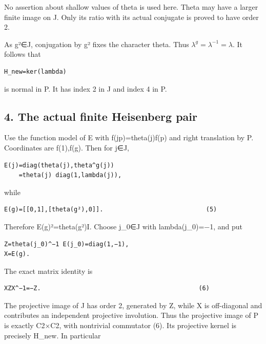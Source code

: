 No assertion about shallow values of theta is used here. Theta may have
a larger finite image on J. Only its ratio with its actual conjugate is
proved to have order 2.

As g²∈J, conjugation by g² fixes the character theta. Thus
\(\lambda^g=\lambda^{-1}=\lambda\). It follows that

\begin{Verbatim}[fontsize=\small,breaklines=true,breakanywhere=true]
H_new=ker(lambda)
\end{Verbatim}

is normal in P. It has index 2 in J and index 4 in P.

\hypertarget{rank2-the-actual-finite-heisenberg-pair}{%
\subsection{4. The actual finite Heisenberg
pair}\label{rank2-the-actual-finite-heisenberg-pair}}

Use the function model of E with f(jp)=theta(j)f(p) and right
translation by P. Coordinates are f(1),f(g). Then for j∈J,

\begin{Verbatim}[fontsize=\small,breaklines=true,breakanywhere=true]
E(j)=diag(theta(j),theta^g(j))
    =theta(j) diag(1,lambda(j)),
\end{Verbatim}

while

\begin{Verbatim}[fontsize=\small,breaklines=true,breakanywhere=true]
E(g)=[[0,1],[theta(g²),0]].                            (5)
\end{Verbatim}

Therefore E(g)²=theta(g²)I. Choose j\_0∈J with lambda(j\_0)=−1, and put

\begin{Verbatim}[fontsize=\small,breaklines=true,breakanywhere=true]
Z=theta(j_0)^−1 E(j_0)=diag(1,−1),
X=E(g).
\end{Verbatim}

The exact matrix identity is

\begin{Verbatim}[fontsize=\small,breaklines=true,breakanywhere=true]
XZX^−1=−Z.                                           (6)
\end{Verbatim}

The projective image of J has order 2, generated by Z, while X is
off-diagonal and contributes an independent projective involution. Thus
the projective image of P is exactly C2×C2, with nontrivial commutator
(6). Its projective kernel is precisely H\_new. In particular

